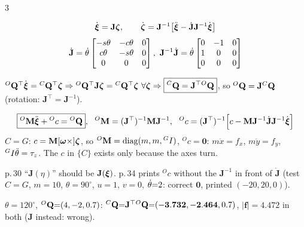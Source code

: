 \begin{multicols}{3}
\nopagebreak[4]
\begin{fbx}
\[\dot{\boldsymbol\xi}=\mathbf J\boldsymbol\zeta,\qquad \dot{\boldsymbol\zeta}=\mathbf J^{-1}\big[\ddot{\boldsymbol\xi}-\dot{\mathbf J}\mathbf J^{-1}\dot{\boldsymbol\xi}\big]\]
\[\dot{\mathbf J}=\wEth\begin{bmatrix}-s\theta&-c\theta&0\\c\theta&-s\theta&0\\0&0&0\end{bmatrix},\ \mathbf J^{-1}\dot{\mathbf J}=\wEth\begin{bmatrix}0&-1&0\\1&0&0\\0&0&0\end{bmatrix}\]
\end{fbx}
\begin{fbx}
${}^{O}\mathbf Q^\top\dot{\boldsymbol\xi}={}^{C}\mathbf Q^\top\boldsymbol\zeta\Rightarrow{}^{O}\mathbf Q^\top\mathbf J\boldsymbol\zeta={}^{C}\mathbf Q^\top\boldsymbol\zeta\ \forall\boldsymbol\zeta\Rightarrow\boxed{{}^{C}\mathbf Q=\mathbf J^\top{}^{O}\mathbf Q}$, so ${}^{O}\mathbf Q=\mathbf J{}^{C}\mathbf Q$ (rotation: $\mathbf J^\top=\mathbf J^{-1}$).
\end{fbx}
\begin{fbx}[EoM in $\{O\}$ \pg{34}]
\[\boxed{{}^O\mathbf M\ddot{\boldsymbol\xi}+{}^Oc={}^O\mathbf Q},\ \ {}^O\mathbf M=(\mathbf J^\top)^{-1}\mathbf M\mathbf J^{-1},\ \ {}^Oc=(\mathbf J^\top)^{-1}\Big[c-\mathbf M\mathbf J^{-1}\dot{\mathbf J}\mathbf J^{-1}\dot{\boldsymbol\xi}\Big]\]
$C=G$: $c=\mathbf M[\boldsymbol\omega\times]\boldsymbol\zeta$, so ${}^O\mathbf M=\operatorname{diag}(m,m,{}^{G}I)$, ${}^Oc=\mathbf 0$: $m\ddot x=f_x$, $m\ddot y=f_y$, ${}^{G}I\ddot\theta=\tau_z$. The $c$ in $\{C\}$ exists only because the axes turn. \chk
\end{fbx}
\begin{slideerr}[p.\,30 and p.\,34]
p.\,30 ``$\mathbf J(\eta)$'' should be $\mathbf J(\boldsymbol\xi)$. p.\,34 prints ${}^Oc$ without the $\mathbf J^{-1}$ in front of $\dot{\mathbf J}$ (test $C{=}G$, $m{=}10$, $\theta{=}90^\circ$, $u{=}1$, $v{=}0$, $\dot\theta{=}2$: correct $\mathbf 0$, printed $(-20,20,0)$). \chk
\end{slideerr}
\begin{worked}
$\theta{=}120^\circ$, ${}^{O}\mathbf Q{=}(4,-2,0.7)$: ${}^{C}\mathbf Q{=}\mathbf J^\top{}^{O}\mathbf Q{=}(\mathbf{-3.732},\mathbf{-2.464},0.7)$, $|\mathbf f|{=}4.472$ in both ($\mathbf J$ instead: wrong). \chk
\end{worked}


\end{multicols}
